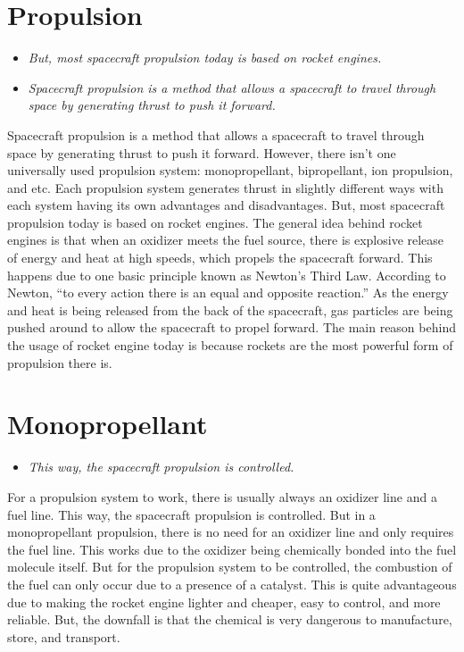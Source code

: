 \section{Propulsion}\label{propulsion}

\begin{itemize}
\item
  \emph{But, most spacecraft propulsion today is based on rocket
  engines.}
\item
  \emph{Spacecraft propulsion is a method that allows a spacecraft to
  travel through space by generating thrust to push it forward.}
\end{itemize}

Spacecraft propulsion is a method that allows a spacecraft to travel
through space by generating thrust to push it forward. However, there
isn't one universally used propulsion system: monopropellant,
bipropellant, ion propulsion, and etc. Each propulsion system generates
thrust in slightly different ways with each system having its own
advantages and disadvantages. But, most spacecraft propulsion today is
based on rocket engines. The general idea behind rocket engines is that
when an oxidizer meets the fuel source, there is explosive release of
energy and heat at high speeds, which propels the spacecraft forward.
This happens due to one basic principle known as Newton's Third Law.
According to Newton, ``to every action there is an equal and opposite
reaction.'' As the energy and heat is being released from the back of
the spacecraft, gas particles are being pushed around to allow the
spacecraft to propel forward. The main reason behind the usage of rocket
engine today is because rockets are the most powerful form of propulsion
there is.

\section{Monopropellant}\label{monopropellant}

\begin{itemize}
\item
  \emph{This way, the spacecraft propulsion is controlled.}
\end{itemize}

For a propulsion system to work, there is usually always an oxidizer
line and a fuel line. This way, the spacecraft propulsion is controlled.
But in a monopropellant propulsion, there is no need for an oxidizer
line and only requires the fuel line. This works due to the oxidizer
being chemically bonded into the fuel molecule itself. But for the
propulsion system to be controlled, the combustion of the fuel can only
occur due to a presence of a catalyst. This is quite advantageous due to
making the rocket engine lighter and cheaper, easy to control, and more
reliable. But, the downfall is that the chemical is very dangerous to
manufacture, store, and transport.

